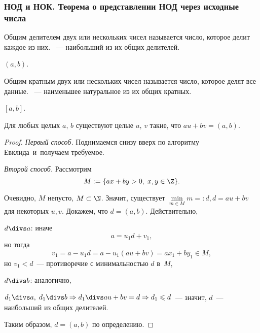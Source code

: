 \subsubsection{НОД и НОК. Теорема о представлении НОД через исходные числа}

\begin{df}
  Общим делителем двух или нескольких чисел называется число, которое делит каждое из них. 
	~--- наибольший из их общих делителей.
\end{df}
\begin{denote}
  $(a,b)$.
\end{denote}

\begin{df}
  Общим кратным двух или нескольких чисел называется число, которое делят все данные. 
	~--- наименьшее натуральное из их общих кратных.
\end{df}
\begin{denote}
  $[a,b]$.
\end{denote}

\begin{stm}
  Для любых целых $a$, $b$ существуют целые $u$, $v$ такие, что $au + bv = (a, b)$.
	\label{au+bv=d}
\end{stm}
\begin{proof}
  \textit{Первый способ.} Поднимаемся снизу вверх по алгоритму Евклида~и~получаем требуемое.

  \textit{Второй способ.} Рассмотрим
  $$
    M := \{ax+by>0,\;x,y\in \Z\}.
  $$

  Очевидно, $M$ непусто, $M\subset\N$. Значит, существует $\min\limits_{m\in M}{m}=:d,d=au+bv$ для некоторых $u,v$.
  Докажем, что $d=(a,b)$. Действительно,
  \begin{points}{0}
  	\item $d\divs a$: иначе 
			$$
				a=u_1d+v_1,
			$$
			но тогда 
			$$
				v_1=a-u_1d=a-u_1(au+bv)=ax_1+by_1\in M,
			$$
	 		но $v_1<d$~--- противоречие с минимальностью $d$ в~$M$,

  	\item $d\divs b$: аналогично,

  	\item $d_1\divs a,\;d_1\divs b\Rightarrow d_1\divs au+bv=d\Rightarrow d_1\leqslant d$~--- 
			значит, $d$~--- наибольший из общих делителей.
	\end{points}

  Таким образом, $d=(a,b)$ по определению.
\end{proof}


